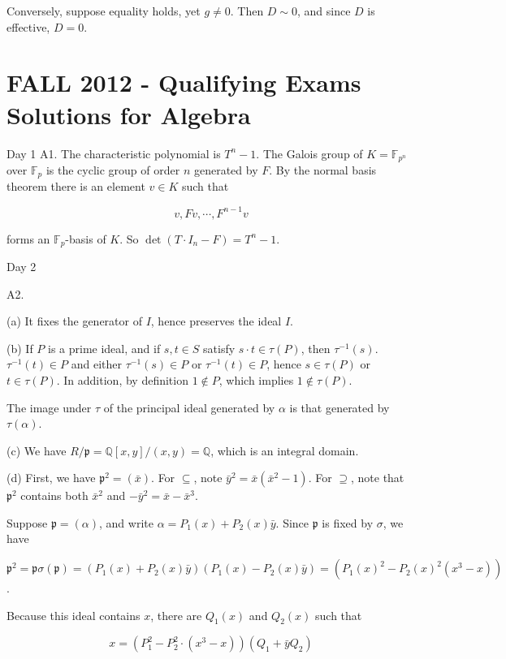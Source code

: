 \documentclass[10pt]{article}
\begin{document}
Conversely, suppose equality holds, yet $g \neq 0$. Then $D \sim 0$, and since $D$ is effective, $D=0$.

\section{FALL 2012 - Qualifying Exams Solutions for Algebra}
Day 1 A1. The characteristic polynomial is $T^{n}-1$. The Galois group of $K=\mathbb{F}_{p^{n}}$ over $\mathbb{F}_{p}$ is the cyclic group of order $n$ generated by $F$. By the normal basis theorem there is an element $v \in K$ such that

$$
v, F v, \cdots, F^{n-1} v
$$

forms an $\mathbb{F}_{p}$-basis of $K$. So $\operatorname{det}\left(T \cdot I_{n}-F\right)=T^{n}-1$.

Day 2

A2.

(a) It fixes the generator of $I$, hence preserves the ideal $I$.

(b) If $P$ is a prime ideal, and if $s, t \in S$ satisfy $s \cdot t \in \tau(P)$, then $\tau^{-1}(s)$. $\tau^{-1}(t) \in P$ and either $\tau^{-1}(s) \in P$ or $\tau^{-1}(t) \in P$, hence $s \in \tau(P)$ or $t \in \tau(P)$. In addition, by definition $1 \notin P$, which implies $1 \notin \tau(P)$.

The image under $\tau$ of the principal ideal generated by $\alpha$ is that generated by $\tau(\alpha)$.

(c) We have $R / \mathfrak{p}=\mathbb{Q}[x, y] /(x, y)=\mathbb{Q}$, which is an integral domain.

(d) First, we have $\mathfrak{p}^{2}=(\bar{x})$. For $\subseteq$, note $\bar{y}^{2}=\bar{x}\left(\bar{x}^{2}-1\right)$. For $\supseteq$, note that $\mathfrak{p}^{2}$ contains both $\bar{x}^{2}$ and $-\bar{y}^{2}=\bar{x}-\bar{x}^{3}$.

Suppose $\mathfrak{p}=(\alpha)$, and write $\alpha=P_{1}(x)+P_{2}(x) \bar{y}$. Since $\mathfrak{p}$ is fixed by $\sigma$, we have

$\mathfrak{p}^{2}=\mathfrak{p} \sigma(\mathfrak{p})=\left(P_{1}(x)+P_{2}(x) \bar{y}\right)\left(P_{1}(x)-P_{2}(x) \bar{y}\right)=\left(P_{1}(x)^{2}-P_{2}(x)^{2}\left(x^{3}-x\right)\right)$.

Because this ideal contains $x$, there are $Q_{1}(x)$ and $Q_{2}(x)$ such that

$$
x=\left(P_{1}^{2}-P_{2}^{2} \cdot\left(x^{3}-x\right)\right)\left(Q_{1}+\bar{y} Q_{2}\right)
$$
\end{document}
